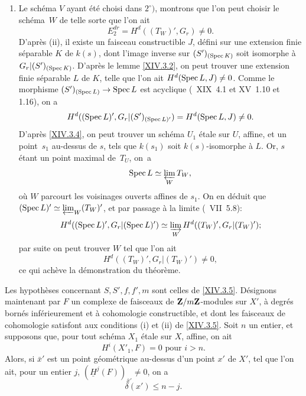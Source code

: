 \begin{enumerate}
\item[$3^\circ)$]
Le sch\'ema $V$ ayant \'et\'e choisi dans $2^\circ)$, montrons que l'on peut choisir le sch\'ema~$W$ de telle sorte que l'on ait
$$
E^{dr}_2 = H^d((T_W)', G_r) \neq 0.
$$
D'apr\`es \textup{(ii)}, il existe un faisceau constructible $J$, d\'efini sur une extension finie s\'eparable $K$ de $k(s)$, dont l'image inverse sur $(S')_{(\operatorname{Spec} K)}$ soit isomorphe \`a ${G_r}{|(S')_{(\operatorname{Spec} K)}}$. D'apr\`es le lemme \ref{XIV.3.2}, on peut trouver une extension finie s\'eparable $L$ de $K$, telle que l'on ait $H^d(\operatorname{Spec} L, J) \neq 0$. Comme le morphisme $(S')_{(\Spec L)} \to \Spec L$ est acyclique (~XIX~4.1 et XV~1.10 et 1.16), on a
$$
H^d((\operatorname{Spec} L)', {G_r}{|(S')_{(\operatorname{Spec} L)'}}) = H^d(\operatorname{Spec} L, J) \neq 0.
$$
D'apr\`es \ref{XIV.3.4}, on peut trouver un sch\'ema $U_1$ \'etale sur $U$, affine, et un point~$s_1$ au-dessus de $s$, tels que $k(s_1)$ soit $k(s)$-isomorphe \`a $L$. Or, $s$ \'etant un point maximal de~$T_U$, on~a
$$
\operatorname{Spec} L \simeq \varprojlim_W T_W,
$$
o\`u $W$ parcourt les voisinages ouverts affines de $s_1$. On en d\'eduit que $(\operatorname{Spec} L)' \simeq \varprojlim_W(T_W)'$, et par passage \`a la limite (~VII~5.8):
$$
H^d((\operatorname{Spec} L)', {G_r}{|(\operatorname{Spec} L)'}) \simeq \varinjlim_W H^d((T_W)', {G_r}{|(T_W)'});
$$
par suite on peut trouver $W$ tel que l'on ait
$$
H^d((T_W)', {G_r}{|(T_W)'})\neq 0,
$$
ce qui ach\`eve la d\'emonstration du th\'eor\`eme.
\end{enumerate}

\begin{corollaire} \label{XIV.3.6}
Les hypoth\`eses concernant $S, S', f, f', m$ sont celles de \ref{XIV.3.5}. D\'esignons maintenant par $F$ un complexe de faisceaux de $\mathbf{Z}/m\mathbf{Z}$-modules sur $X'$, \`a degr\'es born\'es inf\'erieurement et \`a cohomologie constructible, et dont les faisceaux de cohomologie satisfont aux conditions \textup{(i)} et \textup{(ii)} de \ref{XIV.3.5}. Soit $n$ un entier, et supposons que, pour tout sch\'ema $X_1$ \'etale sur $X$, affine, on ait
$$
H^i(X'_1, F)=0\text{ pour } i>n.
$$
Alors, si $\bar{x}'$ est un point g\'eom\'etrique au-dessus d'un point $x'$ de $X'$, tel que l'on ait, pour un entier $j$, $(\underline{H}^j(F))_{\bar{x}'} \neq 0$, on a
$$
\delta(x')\leq n-j.
$$
\end{corollaire}

